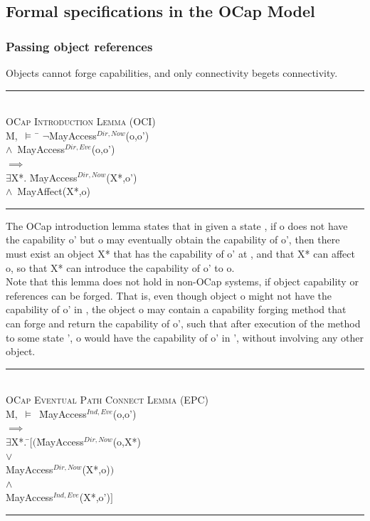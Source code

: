 \documentclass[a4paper,11pt, twoside,twocolumn]{article}
\newenvironment{logic}
{\begin{minipage}[c]{\linewidth}  \small \vspace{0.5em}\begin{tabbing}}
{\end{tabbing}\end{minipage}\vspace{0.5em}}
\newcommand{\loexists}{$\exists$}
\newcommand{\loand}{$\land$}
\newcommand{\loor} {$\lor$}
\newcommand{\loimplies}{$\implies$}
\newcommand{\losigma}{\text{$\upsigma$}}
\newcommand{\loturns} {$\vDash$}
\newcommand{\loneg}{$\boldsymbol \neg$}
\newcommand{\hr}{\rule{\linewidth}{0.4pt}}
\begin{document}
\subsection{Formal specifications in the OCap Model}\label{ocaprules}

\subsubsection{Passing object references}
Objects cannot forge capabilities, and only connectivity begets connectivity.\\
\begin{logic}
\hr\\
\textsc{\normalsize *OCap Introduction Lemma (OCI)}\\\vspace{0.5em}
M,\losigma\ \loturns\
\= \loneg MayAccess$^{Dir,Now}$(o,o')\\
\> \loand\ MayAccess$^{Dir,Eve}$(o,o')\\
\> \loimplies \\
\> \loexists X*. \=MayAccess$^{Dir,Now}$(X*,o')\\
\> \> \loand\  MayAffect(X*,o)\\
\hr
\end{logic}
The OCap introduction lemma states that in given a state \losigma, if o does not have the capability o' but o may eventually obtain the capability of o', then there must exist an object X* that has the capability of o' at \losigma, and that X* can affect o, so that X* can introduce the capability of o' to o.\\

Note that this lemma does not hold in non-OCap systems, if object capability or references can be forged. That is, even though object o might not have the capability of o' in \losigma, the object o may contain a capability forging method that can forge and return the capability of o', such that after execution of the method to some state \losigma', o would have the capability of o' in \losigma', without involving any other object.

\begin{logic}
\hr\\
\textsc{\normalsize *OCap Eventual Path Connect Lemma (EPC)}\\
M,\losigma\ \loturns\ \=MayAccess$^{Ind,Eve}$(o,o')\\
\> \loimplies\\
\> \loexists X*. \=$[ ($\=MayAccess$^{Dir,Now}$(o,X*)\\
\>\>\> \loor \\
\>\>\> MayAccess$^{Dir,Now}$(X*,o)$)$\\
\>\>\loand \\
\>\>MayAccess$^{Ind,Eve}$(X*,o')$ ]$\\
\hr
\end{logic}
\end{document}
